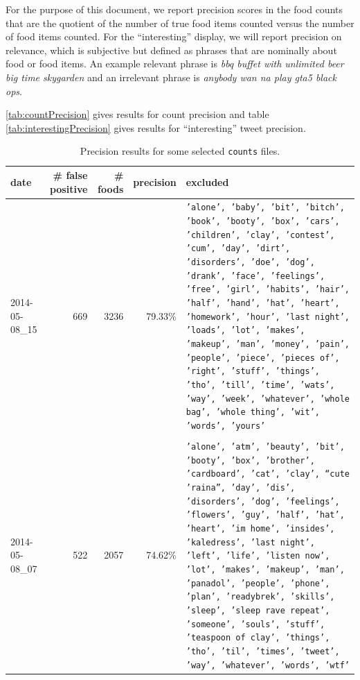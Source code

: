\documentclass[letterpaper]{article}%
\begin{document}
For the purpose of this document, we report precision scores in the food counts
that are the quotient of the number of true food items counted versus the
number of food items counted.  For the ``interesting'' display, we will report
precision on relevance, which is subjective but defined as phrases that are
nominally about food or food items. An example relevant phrase is \textsl{bbq
buffet with unlimited beer big time skygarden} and an irrelevant phrase is
\textsl{anybody wan na play gta5 black ops}.

\autoref{tab:countPrecision} gives results for count precision and table
\autoref{tab:interestingPrecision} gives results for ``interesting'' tweet
precision.

\begin{table}[h]
  \centering
  \begin{tabular}{lrrrp{4cm}}
    \toprule
    date & \# false positive & \# foods & precision & excluded \\
    \midrule
    2014-05-08\_15 & 669 & 3236 & 79.33\% &
    {\tiny \texttt{'alone', 'baby', 'bit', 'bitch', 'book', 'booty', 'box',
      'cars', 'children', 'clay', 'contest', 'cum', 'day', 'dirt', 'disorders',
      'doe', 'dog', 'drank', 'face', 'feelings', 'free', 'girl', 'habits', 'hair',
      'half', 'hand', 'hat', 'heart', 'homework', 'hour', 'last night', 'loads',
      'lot', 'makes', 'makeup', 'man', 'money', 'pain', 'people', 'piece', 'pieces
      of', 'right', 'stuff', 'things', 'tho', 'till', 'time', 'wats', 'way', 'week',
      'whatever', 'whole bag', 'whole thing', 'wit', 'words', 'yours'}
    } \\
    \\
    2014-05-08\_07 & 522 & 2057 & 74.62\% &
    {\tiny \texttt{'alone', 'atm', 'beauty', 'bit', 'booty', 'box', 'brother',
      'cardboard', 'cat', 'clay', ``cute 'raina'', 'day', 'dis', 'disorders',
      'dog', 'feelings', 'flowers', 'guy', 'half', 'hat', 'heart', 'im home',
      'insides', 'kaledress', 'last night', 'left', 'life', 'listen now',
      'lot', 'makes', 'makeup', 'man', 'panadol', 'people', 'phone', 'plan',
      'readybrek', 'skills', 'sleep', 'sleep rave repeat', 'someone', 'souls',
      'stuff', 'teaspoon of clay', 'things', 'tho', 'til', 'times', 'tweet',
      'way', 'whatever', 'words', 'wtf'}
    } \\
    \bottomrule
  \end{tabular}
  \caption{Precision results for some selected \texttt{counts} files.}
  \label{tab:countPrecision}
\end{table}
\end{document}
